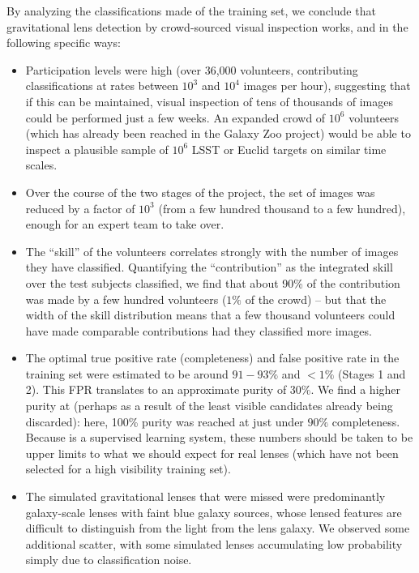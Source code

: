\documentclass[useAMS,usenatbib,a4paper]{mn2e}
\begin{document}
By analyzing the  classifications made of the training set, we conclude that
gravitational lens detection by crowd-sourced visual inspection works,  and in
the following specific ways:

\begin{itemize}

\item Participation levels were high (over 36,000 volunteers, contributing
classifications at rates between $10^3$ and $10^4$ images per hour), suggesting
that if this can be maintained, visual inspection of tens of thousands of images
could be performed just a few weeks. An expanded crowd of $10^6$ volunteers
(which has already been reached in the Galaxy Zoo project) would
be able to inspect a plausible sample of $10^6$ LSST or Euclid targets
on similar time scales.

\item Over the course of the two stages of the \cfhtls project, the
set of images was reduced by a factor of $10^3$ (from a few hundred thousand to
a few hundred), enough for an expert team to take over.

\item The ``skill'' of the volunteers correlates strongly with the number of
images they have classified.  Quantifying the ``contribution'' as the integrated
skill over the test subjects classified, we find that about 90\% of the
contribution was made by a few hundred volunteers ($1\%$ of the crowd) -- but
that the width of the skill distribution means that a  few thousand volunteers
could have made comparable contributions had they classified more images.

\item The optimal true positive rate (completeness) and false positive rate in
the training set were estimated to be around $91-93\%$ and $<1\%$ (Stages 1 and
2). This FPR translates to an approximate purity of 30\%. We find a
higher purity at \StageTwo (perhaps as a result of the least visible candidates already
being discarded): here, 100\% purity was reached at just under $90\%$
completeness. Because \SW is a supervised learning system, these numbers should
be taken to be upper limits to what we should expect for real lenses (which have
not been selected for a high visibility training set).

\item The simulated gravitational lenses that were missed were predominantly
galaxy-scale lenses with faint blue galaxy sources, whose lensed features are
difficult to distinguish from the light from the lens galaxy. We observed some
additional scatter, with some simulated lenses accumulating low probability
simply due to classification noise.

\end{itemize}
\end{document}
